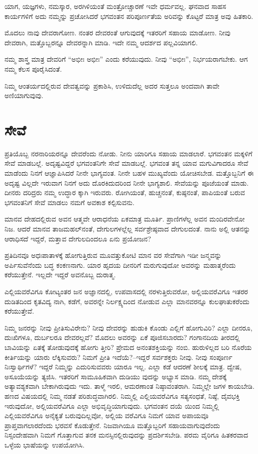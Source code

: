 ಯಾಗ, ಯಜ್ಞಗಳು, ನಮಸ್ಕಾರ, ಅರಗಿಳಿಯಂತೆ ಮಂತ್ರೋಚ್ಚಾರಣೆ ಇವೇ ಧರ್ಮವಲ್ಲ. ಘನವಾದ ಸಾಹಸ ಕಾರ್ಯಗಳಿಗೆ ಅದು ನಮ್ಮನ್ನು ಪ್ರಚೋಸಿದರೆ ಭಗವಂತನ ಪರಿಪೂರ್ಣತೆಯ ಅರಿವನ್ನು ಕೊಟ್ಟರೆ ಮಾತ್ರ ಅವು ಹಿತಕಾರಿ.

ಮೊದಲು ನಾವು ದೇವರಾಗೋಣ. ನಂತರ ದೇವರಂತೆ ಆಗುವುದಕ್ಕೆ ಇತರರಿಗೆ ಸಹಾಯ ಮಾಡೋಣ. ನೀವು ದೇವರಾಗಿ, ಮತ್ತೊಬ್ಬರನ್ನೂ ದೇವರನ್ನಾಗಿ ಮಾಡಿ. ಇದೇ ನಮ್ಮ ಆದರ್ಶದ ಪಲ್ಲವಿಯಾಗಲಿ.

ನಮ್ಮ ಶಾಸ್ತ್ರ ಮಾತ್ರ ದೇವರಿಗೆ “ಅಭೀಃ ಅಭೀಃ” ಎಂದು ಕರೆಯುವುದು. ನೀವು “ಅಭೀಃ”, ನಿರ್ಭಯರಾಗಬೇಕು. ಆಗ ನಮ್ಮ ಕೆಲಸ ಪೂರೈಸಿದಂತೆ.

ನಿಮ್ಮ ಆಂತರ್ಯದಲ್ಲಿರುವ ದೇವತ್ವವನ್ನು ಪ್ರಕಾಶಿಸಿ, ಉಳಿದುದೆಲ್ಲ ಅದರ ಸುತ್ತಲೂ ಅಂದವಾಗಿ ತಾವೇ ಅಣಿಯಾಗುವುವು.


\section{ಸೇವೆ}

ಪ್ರತಿಯೊಬ್ಬ ನರನಾರಿಯರನ್ನೂ ದೇವರೆಂದು ನೋಡು. ನೀನು ಯಾರಿಗೂ ಸಹಾಯ ಮಾಡಲಾರೆ. ಭಗವಂತನ ಮಕ್ಕಳಿಗೆ ಸೇವೆ ಮಾಡಬಲ್ಲೆ. ಅದೃಷ್ಟವಿದ್ದರೆ ಭಗವಂತನಿಗೇ ಸೇವೆ ಮಾಡಬಲ್ಲೆ. ಭಗವಂತ ತನ್ನ ಯಾವ ಮಗುವಿಗಾದರೂ ಸೇವೆ ಮಾಡೆಂದು ನಿನಗೆ ಆಜ್ಞಾಪಿಸಿದರೆ ನೀನೇ ಭಾಗ್ಯವಂತ. ನೀನೇ ಬಹಳ ಮುಖ್ಯವೆಂದು ಯೋಚಿಸಬೇಡ. ಮತ್ತೊಬ್ಬನಿಗೆ ಈ ಅದೃಷ್ಟ ವಿಲ್ಲದೇ ಇರುವಾಗ ನಿನಗೆ ಅದು ದೊರಕಿದುದರಿಂದ ನೀನೇ ಭಾಗ್ಯಶಾಲಿ. ಸೇವೆಯನ್ನು ಪೂಜೆಯಂತೆ ಮಾಡು. ದೀನರು ದರಿದ್ರರು ನಮ್ಮ ಉದ್ಧಾರ ಕ್ಕಾಗಿ ಇರುವರು. ರೋಗಿಯಂತೆ, ಹುಚ್ಚನಂತೆ, ಕುಷ್ಠನಂತೆ, ಪಾಪಿಯಂತೆ ಬರುವ ಭಗವಂತನಿಗೆ ಸೇವೆ ಮಾಡಲು ನಮಗೆ ಅವಕಾಶ ಕಲ್ಪಿಸುವನು.

ಮಾನವ ದೇಹದಲ್ಲಿರುವ ಅವನ ಆತ್ಮವೇ ಆರಾಧನೆಯ ಏಕಮಾತ್ರ ಮೂರ್ತಿ. ಪ್ರಾಣಿಗಳೆಲ್ಲ ಅವನ ಮಂದಿರವೇನೋ ನಿಜ. ಆದರೆ ಮಾನವ ತಾಜಮಹಲ್​ನಂತೆ, ದೇಗುಲಗಳಲ್ಲೆಲ್ಲ ಸರ್ವಶ್ರೇಷ್ಠವಾದ ದೇಗುಲದಂತೆ. ನಾನು ಅಲ್ಲಿ ಆತನನ್ನು ಆರಾಧಿಸದೆ ಇದ್ದರೆ, ಮತ್ತಾವ ದೇಗುಲದಿಂದಲೂ ಏನು ಪ್ರಯೋಜನ?

ಪ್ರತಿದಿನವೂ ಅಧಃಪಾತಾಳಕ್ಕೆ ಹೋಗುತ್ತಿರುವ ಮೂವತ್ತುಕೋಟಿ ಮಾನ ವರ ಸೇವೆಗಾಗಿ ಇಡೀ ಜನ್ಮವನ್ನು ಅರ್ಪಿಸುವೆನೆಂದು ಬದ್ಧ ಕಂಕಣನಾಗು. ಯಾರ ಹೃದಯ ದೀನರಿಗೆ ಮರುಗುವುದೋ ಅವರನ್ನು ಮಹಾತ್ಮರೆಂದು ಕರೆಯುತ್ತೇನೆ. ಇಲ್ಲದೇ ಇದ್ದರೆ ಅವನೊಬ್ಬ ದುರಾತ್ಮ. 

ಎಲ್ಲಿಯವರೆವಿಗೂ ಕೋಟ್ಯಂತರ ಜನ ಅಜ್ಞಾನದಲ್ಲಿ, ಉಪವಾಸದಲ್ಲಿ ನರಳುತ್ತಿರುವರೋ, ಅಲ್ಲಿಯವರೆವಿಗೂ ಇತರರ ದುಡಿತದಿಂದ ಕೃತವಿದ್ಯ ನಾಗಿ, ಕಡೆಗೆ, ಅವರನ್ನೇ ನಿರ್ಲಕ್ಷ್ಯದಿಂದ ನೋಡುವ ಎಲ್ಲಾ ಮಾನವರನ್ನೂ ಕುಲಘಾತುಕರೆಂದು ಕರೆಯುತ್ತೇವೆ.

ನಿಮ್ಮ ಜನರನ್ನು ನೀವು ಪ್ರೀತಿಸುವಿರೇನು? ನೀವು ದೇವರನ್ನು ಹುಡುಕಿ ಕೊಂಡು ಎಲ್ಲಿಗೆ ಹೋಗುವಿರಿ? ಎಲ್ಲಾ ದೀನರೂ, ದುಃಖಿಗಳೂ, ದುರ್ಬಲರೂ ದೇವರಲ್ಲವೆ? ಮೊದಲು ಅವರನ್ನು ಏಕೆ ಪೂಜಿಸಬಾರದು? ಗಂಗಾನದಿಯ ತೀರದಲ್ಲಿ ಬಾವಿಯನ್ನು ಏತಕ್ಕೆ ತೋಡುವುದಕ್ಕೆ ಹೋಗು ತ್ತೀರಿ? ಪ್ರೇಮದ ಅನಂತಶಕ್ತಿಯನ್ನು ನಂಬಿ. ಹುರುಳಿಲ್ಲದ ಬರಿ ನೊರೆಯ ಕೀರ್ತಿಯನ್ನು ಯಾರು ಲೆಕ್ಕಿಸುವರು? ನಿಮಗೆ ಪ್ರೀತಿ ಇದೆಯೆ?–ಇದ್ದರೆ ಸರ್ವಶಕ್ತರು ನೀವು. ನೀವು ಸಂಪೂರ್ಣ ನಿಃಸ್ವಾರ್ಥಿಗಳೆ? ಇದ್ದರೆ ನಿಮ್ಮನ್ನು ಎದುರಿಸುವವರು ಯಾರೂ ಇಲ್ಲ. ಎಲ್ಲಾ ಕಡೆ ಆದರಣೆ ಶೀಲಕ್ಕೆ ಮಾತ್ರ. ದ್ವೇಷ, ಅಸೂಯೆಯನ್ನು ತ್ಯಜಿಸಿ. ಇತರರಿಗೆ ಸಾಮೂಹಿಕವಾಗಿ ದುಡಿಯು ವುದನ್ನು ಅಭ್ಯಾಸ ಮಾಡಿ. ನಮ್ಮ ದೇಶಕ್ಕೆ ಅತ್ಯಾವಶ್ಯಕವಾಗಿ ಬೇಕಾಗಿರುವುದು ಇದು. ತಾಳ್ಮೆ ಇರಲಿ, ಆಮರಣಾಂತ ನಿಷ್ಠಾವಂತರಾಗಿ. ನಿಮ್ಮಲ್ಲೇ ಜಗಳ ಕಾಯಬೇಡಿ. ಹಣದ ವಿಷಯದಲ್ಲಿ ನಿಮ್ಮ ನಡತೆ ಪರಿಶುದ್ಧವಾಗಿರಲಿ. ನಿಮ್ಮಲ್ಲಿ ಎಲ್ಲಿಯವರೆವಿಗೂ ಸತ್ಯಸಂಧತೆ, ನಿಷ್ಠೆ, ದೈವಭಕ್ತಿ ಇರುವುದೋ, ಅಲ್ಲಿಯವರೆವಿಗೂ ಎಲ್ಲಾ ಅಭಿವೃದ್ಧಿಯಾಗುವುದು. ಭಗವಂತನ ದಯೆ ಯಿಂದ ನಿಮ್ಮಲ್ಲಿ ಎಲ್ಲಿಯವರೆವಿಗೂ ಅನೈಕ್ಯತೆ ಬರುವುದಿಲ್ಲವೋ, ಅಲ್ಲಿಯ ವರೆವಿಗೂ ನಿಮಗೆ ಯಾವ ಅಪಾಯವೂ ಪ್ರಾಪ್ತವಾಗಲಾರದೆಂದು ಭರವಸೆ ಕೊಡುತ್ತೇನೆ. ನಿಜವಾಗಿಯೂ ಮತ್ತೊಬ್ಬರಿಗೆ ಸಹಾಯವಾಗುವುದೆಂದು ನಿಸ್ಸಂದೇಹವಾಗಿ ನಿಮಗೆ ಗೊತ್ತಾಗುವ ತನಕ ಮನಸ್ಸಿನಲ್ಲಿರುವುದನ್ನು ಪ್ರದರ್ಶಿಸಬೇಡಿ. ಪರಮ ವೈರಿಗೂ ಹಿತಕರವಾದ ಒಳ್ಳೆಯ ಭಾಷೆಯನ್ನು ಉಪಯೋಗಿಸಿ.


